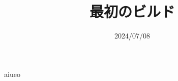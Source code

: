 \documentclass[a4paper,11pt]{article}
\begin{document}
\title{最初のビルド}
\author{}
\date{2024/07/08}
\maketitle

aiueo
\end{document}
